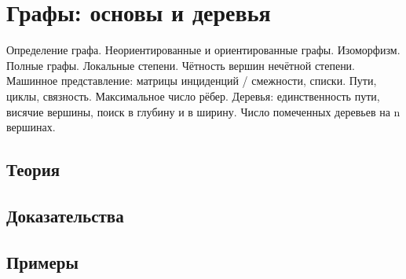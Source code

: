 
\section{Графы: основы и деревья}
\label{sec:2.2.08-graphs-basics}

\begin{ticket}
Определение графа. Неориентированные и ориентированные графы. Изоморфизм. Полные графы. Локальные степени. Чётность вершин нечётной степени. Машинное представление: матрицы инциденций / смежности, списки. Пути, циклы, связность. Максимальное число рёбер. Деревья: единственность пути, висячие вершины, поиск в глубину и в ширину. Число помеченных деревьев на n вершинах.
\end{ticket}

\subsection*{Теория}

\subsection*{Доказательства}

\subsection*{Примеры}
